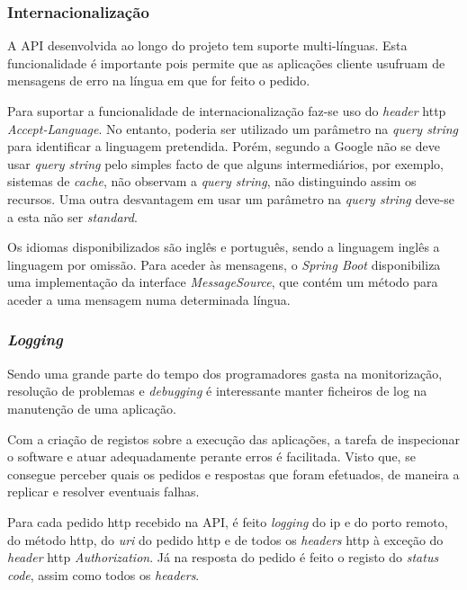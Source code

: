 \subsubsection{Internacionalização}

A API desenvolvida ao longo do projeto tem suporte multi-línguas. Esta funcionalidade é importante pois permite que as aplicações cliente usufruam de mensagens de erro na língua em que for feito o pedido. 

Para suportar a funcionalidade de internacionalização faz-se uso do \textit{header} \acrshort{http} \textit{Accept-Language}. No entanto, poderia ser utilizado um parâmetro na \textit{query string} para identificar a linguagem pretendida. Porém, segundo a Google \cite{LeverageBrowserCaching:google} não se deve usar \textit{query string} pelo simples facto de que alguns intermediários, por exemplo, sistemas de \textit{cache}, não observam a \textit{query string}, não distinguindo assim os recursos. Uma outra desvantagem em usar um parâmetro na \textit{query string} deve-se a esta não ser \textit{standard}. 

Os idiomas disponibilizados são inglês e português, sendo a linguagem inglês a linguagem por omissão. Para aceder às mensagens, o \textit{Spring Boot} disponibiliza uma implementação da interface \textit{MessageSource}, que contém um método para aceder a uma mensagem numa determinada língua.


\subsubsection{\textit{Logging}}

Sendo uma grande parte do tempo dos programadores gasta na monitorização, resolução de problemas e \textit{debugging} é interessante manter ficheiros de \acrfull{log} na manutenção de uma aplicação.

Com a criação de registos sobre a execução das aplicações, a tarefa de inspecionar o software e atuar adequadamente perante erros é facilitada. Visto que, se consegue perceber quais os pedidos e respostas que foram efetuados, de maneira a replicar e resolver eventuais falhas.

Para cada pedido \acrshort{http} recebido na API, é feito \textit{logging} do \acrfull{ip} e do porto remoto, do método \acrshort{http}, do \textit{\acrfull{uri}} do pedido \acrshort{http} e de todos os \textit{headers} \acrshort{http} à exceção do \textit{header} \acrshort{http} \textit{Authorization}. Já na resposta do pedido é feito o registo do \textit{status code}, assim como todos os \textit{headers}. 

